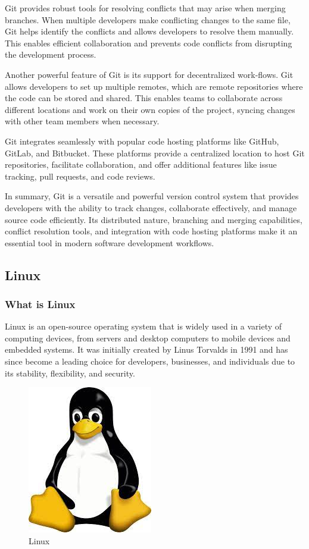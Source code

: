 \documentclass[
12pt,
oneside, 
onehalfspacing, 
nolistspacing, 
parskip, 
chapterinoneline, 
]{AASTCOMPUTER}
\begin{document}
Git provides robust tools for resolving conflicts that may arise when merging branches. When multiple developers make conflicting changes to the same file, Git helps identify the conflicts and allows developers to resolve them manually. This enables efficient collaboration and prevents code conflicts from disrupting the development process.

Another powerful feature of Git is its support for decentralized work-flows. Git allows developers to set up multiple remotes, which are remote repositories where the code can be stored and shared. This enables teams to collaborate across different locations and work on their own copies of the project, syncing changes with other team members when necessary.

Git integrates seamlessly with popular code hosting platforms like GitHub, GitLab, and Bitbucket. These platforms provide a centralized location to host Git repositories, facilitate collaboration, and offer additional features like issue tracking, pull requests, and code reviews.

In summary, Git is a versatile and powerful version control system that provides developers with the ability to track changes, collaborate effectively, and manage source code efficiently. Its distributed nature, branching and merging capabilities, conflict resolution tools, and integration with code hosting platforms make it an essential tool in modern software development workflows.
\newpage
\subsection{Linux}
\subsubsection{What is Linux}
Linux is an open-source operating system that is widely used in a variety of computing devices, from servers and desktop computers to mobile devices and embedded systems. It was initially created by Linus Torvalds in 1991 and has since become a leading choice for developers, businesses, and individuals due to its stability, flexibility, and security.

\begin{figure}[!ht]
	\centering
	\includegraphics[scale=0.5]{Figures/DevOps/linux.jpeg}
  	\caption{Linux}
  	\label{fig:Linux}
\end{figure}
\end{document}
